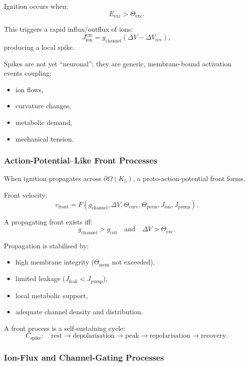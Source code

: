 Ignition occurs when:
\[
E_{\text{exc}} > \Theta_{\text{exc}}.
\]

This triggers a rapid influx/outflux of ions:
\[
J_{\text{ion}}^{\text{exc}} = g_{\text{channel}}(\Delta V - \Delta V_{\text{rev}}),
\]
producing a local spike.

Spikes are not yet “neuronal”; they are generic, membrane-bound
activation events coupling:
\begin{itemize}
    \item ion flows,
    \item curvature changes,
    \item metabolic demand,
    \item mechanical tension.
\end{itemize}

\subsubsection{Action-Potential–Like Front Processes}

When ignition propagates across $\partial\Omega(K_5)$, a 
proto-action-potential front forms.

Front velocity:
\[
v_{\text{front}} = 
F(g_{\text{channel}}, \Delta V, \Theta_{\text{curv}}, 
\Theta_{\text{perm}}, J_{\text{ion}}, J_{\text{pump}}).
\]

A propagating front exists iff:
\[
g_{\text{channel}} > g_{\text{crit}}
\quad\text{and}\quad 
\Delta V > \Theta_{\text{exc}}.
\]

Propagation is stabilised by:
\begin{itemize}
    \item high membrane integrity ($\Theta_{\text{mem}}$ not exceeded),
    \item limited leakage ($J_{\text{leak}} < J_{\text{pump}}$),
    \item local metabolic support,
    \item adequate channel density and distribution.
\end{itemize}

A front process is a self-sustaining cycle:
\[
C_{\text{spike}}:\quad
\text{rest} \to \text{depolarisation} \to 
\text{peak} \to \text{repolarisation} \to \text{recovery}.
\]

\subsubsection{Ion-Flux and Channel-Gating Processes}

